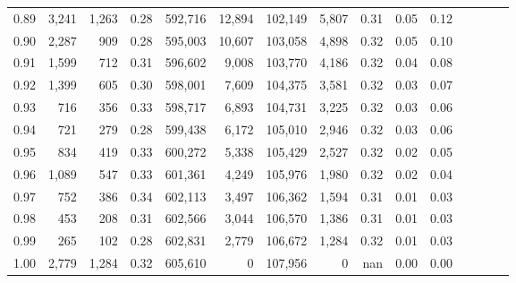 \begin{tabular}{rrrcrrrrrrrrrrr}
0.89 &   3,241 &  1,263 &                                       0.28 &  592,716 &   12,894 &  102,149 &    5,807 &  0.31 &  0.05 &                         0.12 \\
0.90 &   2,287 &    909 &                                       0.28 &  595,003 &   10,607 &  103,058 &    4,898 &  0.32 &  0.05 &                         0.10 \\
0.91 &   1,599 &    712 &                                       0.31 &  596,602 &    9,008 &  103,770 &    4,186 &  0.32 &  0.04 &                         0.08 \\
0.92 &   1,399 &    605 &                                       0.30 &  598,001 &    7,609 &  104,375 &    3,581 &  0.32 &  0.03 &                         0.07 \\
0.93 &     716 &    356 &                                       0.33 &  598,717 &    6,893 &  104,731 &    3,225 &  0.32 &  0.03 &                         0.06 \\
0.94 &     721 &    279 &                                       0.28 &  599,438 &    6,172 &  105,010 &    2,946 &  0.32 &  0.03 &                         0.06 \\
0.95 &     834 &    419 &                                       0.33 &  600,272 &    5,338 &  105,429 &    2,527 &  0.32 &  0.02 &                         0.05 \\
0.96 &   1,089 &    547 &                                       0.33 &  601,361 &    4,249 &  105,976 &    1,980 &  0.32 &  0.02 &                         0.04 \\
0.97 &     752 &    386 &                                       0.34 &  602,113 &    3,497 &  106,362 &    1,594 &  0.31 &  0.01 &                         0.03 \\
0.98 &     453 &    208 &                                       0.31 &  602,566 &    3,044 &  106,570 &    1,386 &  0.31 &  0.01 &                         0.03 \\
0.99 &     265 &    102 &                                       0.28 &  602,831 &    2,779 &  106,672 &    1,284 &  0.32 &  0.01 &                         0.03 \\
1.00 &   2,779 &  1,284 &                                       0.32 &  605,610 &        0 &  107,956 &        0 &   nan &  0.00 &                         0.00 \\
\bottomrule
\end{tabular}
